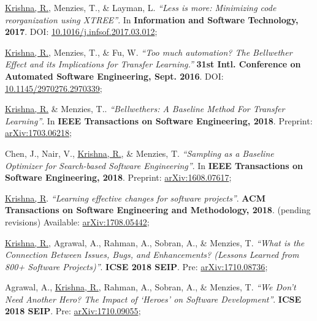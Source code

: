 \documentclass[letterpaper,9pt]{article}
\begin{document}
\begin{enumerate}[label={[\arabic*]}, leftmargin=15pt]

    \item\small \underline{Krishna, R.}, Menzies, T., \& Layman, L. 
    \textit{``Less is more: Minimizing code reorganization using XTREE''}. In 
    \textbf{Information and Software Technology, 2017}. 
    DOI:  
    \href{https://arxiv.org/abs/1609.03614}{10.1016/j.infsof.2017.03.012}\vspace{-6pt};
    
    \item\small  \underline{Krishna, R.}, Menzies, T., \& Fu, W. \textit{``Too 
    much automation? The Bellwether Effect and its Implications for Transfer 
    Learning.''} \textbf{31st Intl. Conference on Automated Software 
    Engineering, Sept. 2016}. DOI: 
    \href{https://doi.org/10.1145/2970276.2970339}{10.1145/2970276.2970339}\vspace{-6pt};
    
    \item\small \underline{Krishna, R.} \& Menzies, T.. \textit{``Bellwethers: 
    A Baseline Method For Transfer Learning''}. In \textbf{IEEE Transactions on 
    Software Engineering, 2018}. Preprint: 
    \href{https://arxiv.org/abs/1703.06218}{arXiv:1703.06218}\vspace{-6pt};
    
    \item\small Chen, J., Nair, V., \underline{Krishna, R.}, \& Menzies, T. 
    \textit{``Sampling as a Baseline Optimizer for Search-based Software 
    Engineering''}. In \textbf{IEEE Transactions on Software Engineering, 2018}. Preprint: 
    \href{https://arxiv.org/abs/1608.07617}{arXiv:1608.07617}\vspace{-6pt};
    
    \item\small \underline{Krishna, R}. \textit{``Learning effective changes 
    for software projects''}. \textbf{ACM Transactions on Software Engineering and Methodology, 2018}. (pending revisions) Available: 
    \href{https://arxiv.org/abs/1708.05442}{arXiv:1708.05442}\vspace{-6pt};
    
    \item\small \underline{Krishna, R.}, Agrawal, A., Rahman, A., Sobran, A., 
    \& Menzies, T. \textit{``What is the Connection Between Issues, Bugs, and 
    Enhancements? (Lessons Learned from 800+ Software Projects)''}. 
    \textbf{ICSE 2018 SEIP}. Pre: 
    \href{https://arxiv.org/abs/1710.08736}{arXiv:1710.08736}\vspace{-6pt};

    \item\small Agrawal, A., \underline{Krishna, R.},  Rahman, A., Sobran, A., 
    \& Menzies, T. \textit{``We Don't Need Another Hero? The Impact of `Heroes' on Software Development''}. 
    \textbf{ICSE 2018 SEIP}. Pre: 
    \href{https://arxiv.org/abs/1710.09055}{arXiv:1710.09055}\vspace{-6pt};
    
\end{enumerate}
\end{document}
